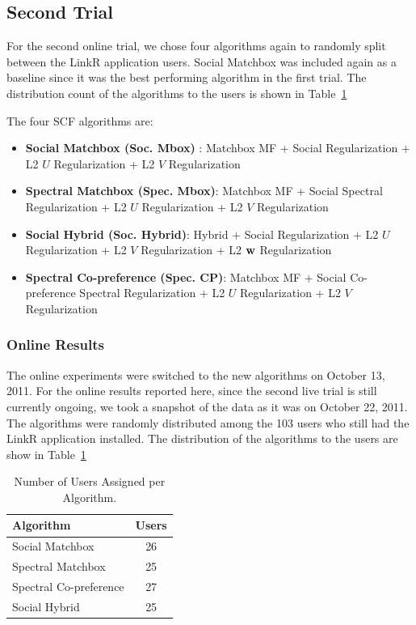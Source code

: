 \subsection{Second Trial}

For the second online trial, we chose four algorithms again to
randomly split between the LinkR application users. Social Matchbox
was included again as a baseline since it was the best performing
algorithm in the first trial. The distribution count of the algorithms
to the users is shown in Table~\ref{tab:assigned2}

The four SCF algorithms are:

\begin{itemize}
\item{{\bf Social Matchbox (Soc. Mbox)} : Matchbox MF + Social Regularization +  L2 $U$ Regularization + L2 $V$ Regularization}
\item{{\bf Spectral Matchbox (Spec. Mbox)}: Matchbox MF + Social Spectral Regularization + L2 $U$ Regularization + L2 $V$ Regularization}
\item{{\bf Social Hybrid (Soc. Hybrid)}: Hybrid + Social Regularization + L2 $U$ Regularization + L2 $V$ Regularization + L2 $\mathbf{w}$ Regularization}
\item{{\bf Spectral Co-preference (Spec. CP)}: Matchbox MF + Social Co-preference Spectral Regularization + L2 $U$ Regularization + L2 $V$ Regularization}
\end{itemize}

\subsubsection{Online Results}
\label{sec:online2}

The online experiments were switched to the new algorithms on October
13, 2011. For the online results reported here, since the second live
trial is still currently ongoing, we took a snapshot of the data as it
was on October 22, 2011. The algorithms were randomly distributed
among the 103 users who still had the LinkR application installed. The
distribution of the algorithms to the users are show in
Table~\ref{tab:assigned2}


\begin{table}[t!]
\centering
\begin{tabular}{| l | c |}
\hline
{\bf Algorithm} & {\bf Users} \\
\hline
Social Matchbox & 26\\
Spectral Matchbox  & 25 \\
Spectral Co-preference & 27 \\
Social Hybrid & 25 \\
\hline
\end{tabular}
\caption{Number of Users Assigned per Algorithm.}
\label{tab:assigned2}
\end{table}

